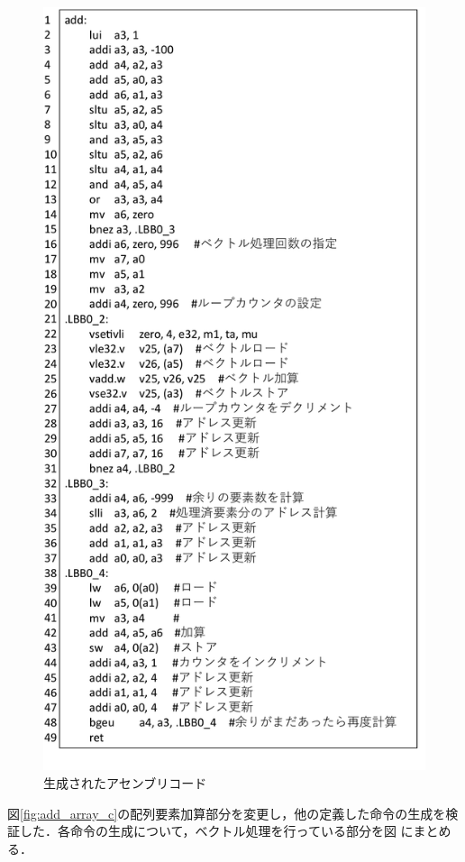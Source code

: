 \begin{figure}
    \centering
    \includegraphics[scale=0.55]{image/rv_vectorized_assembly.pdf}
    \caption{生成されたアセンブリコード}
    \label{fig:rv_vectorized_assembly}
\end{figure}

図\ref{fig:add_array_c}の配列要素加算部分を変更し，他の定義した命令の生成を検証した．各命令の生成について，ベクトル処理を行っている部分を図%
にまとめる．
